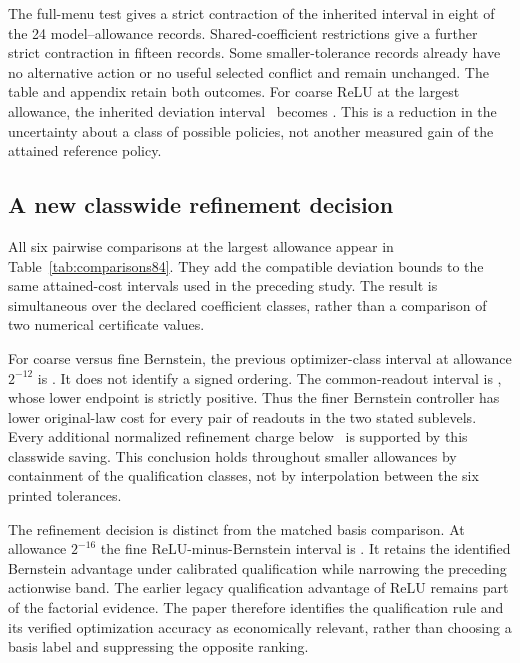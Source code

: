 

The full-menu test gives a strict contraction of the inherited interval in eight of the 24 model--allowance records. Shared-coefficient restrictions give a further strict contraction in fifteen records. Some smaller-tolerance records already have no alternative action or no useful selected conflict and remain unchanged. The table and appendix retain both outcomes. For coarse ReLU at the largest allowance, the inherited deviation interval \CoarseReLUBefore\ becomes \CoarseReLUAfter. This is a reduction in the uncertainty about a class of possible policies, not another measured gain of the attained reference policy.

\subsection{A new classwide refinement decision}
All six pairwise comparisons at the largest allowance appear in Table~\ref{tab:comparisons84}. They add the compatible deviation bounds to the same attained-cost intervals used in the preceding study. The result is simultaneous over the declared coefficient classes, rather than a comparison of two numerical certificate values.



For coarse versus fine Bernstein, the previous optimizer-class interval at allowance $2^{-12}$ is \BernsteinResolutionBefore. It does not identify a signed ordering. The common-readout interval is \BernsteinResolutionAfter, whose lower endpoint is strictly positive. Thus the finer Bernstein controller has lower original-law cost for every pair of readouts in the two stated sublevels. Every additional normalized refinement charge below \BernsteinRefinementFee\ is supported by this classwide saving. This conclusion holds throughout smaller allowances by containment of the qualification classes, not by interpolation between the six printed tolerances.

The refinement decision is distinct from the matched basis comparison. At allowance $2^{-16}$ the fine ReLU-minus-Bernstein interval is \FineBasisAfter. It retains the identified Bernstein advantage under calibrated qualification while narrowing the preceding actionwise band. The earlier legacy qualification advantage of ReLU remains part of the factorial evidence. The paper therefore identifies the qualification rule and its verified optimization accuracy as economically relevant, rather than choosing a basis label and suppressing the opposite ranking.


